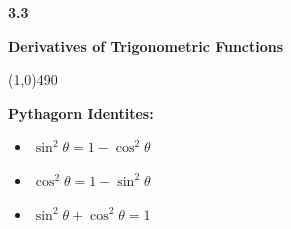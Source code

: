 \documentclass{report}
\begin{document}
  \pagebreak \bigbreak \noindent
  \begin{Large}
      \begin{mdframed}
          \begin{center}
              \textbf{3.3}
          \end{center}
      \end{mdframed}
  \end{Large}
  \begin{Large}
      \begin{center}
          \textbf{Derivatives of Trigonometric Functions}
      \end{center}
  \end{Large}
  \line(1,0){490}
  
  \bigbreak \noindent \bigbreak \noindent \bigbreak \noindent 
  \begin{mdframed}
    \textbf{Pythagorn Identites:}
    \begin{itemize}
      \item $\sin^{2}{\theta} = 1-\cos^{2}{\theta}$
      \item $\cos^{2}{\theta} = 1 - \sin^{2}{\theta }$
      \item $\sin^{2}{\theta}+\cos^{2}{\theta}= 1$
    \end{itemize}
  \end{mdframed}
\end{document}
